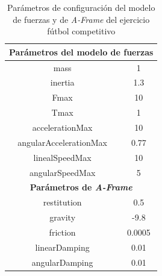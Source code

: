 \begin{table}[h!]
\centering
\begin{tabular}{|c|c|}
\hline
\multicolumn{2}{|c|}{\textbf{Parámetros del modelo de fuerzas}}                \\ \hline
mass                                           & 1                             \\ \hline
inertia                                        & 1.3                           \\ \hline
Fmax                                           & 10                            \\ \hline
Tmax                                           & 1                             \\ \hline
accelerationMax                                & 10                            \\ \hline
angularAccelerationMax                         & 0.77                          \\ \hline
linealSpeedMax                                 & 10                            \\ \hline
angularSpeedMax                                & 5                             \\ \hline
\multicolumn{2}{|c|}{\textbf{Parámetros de \textit{A-Frame}}} \\ \hline
restitution                                    & 0.5                           \\ \hline
gravity                                        & -9.8                          \\ \hline
friction                                       &  0.0005                       \\ \hline
linearDamping                                  & 0.01                         \\ \hline
angularDamping                                 & 0.01                         \\ \hline
\end{tabular}
\caption{Parámetros de configuración del modelo de fuerzas y de \textit{A-Frame} del ejercicio fútbol competitivo}
\label{tabla:param_ej4}
\end{table}

